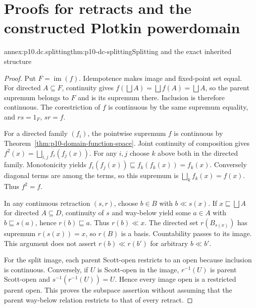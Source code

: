 \section{Proofs for retracts and the constructed Plotkin powerdomain}
\label{annex:p10-domain-constructions-retractions}

\begin{annexitem}{annex:p10.dc.splitting}{thm:p10-dc-splitting}{Splitting and the exact inherited structure}
\begin{proof}
Put \(F=\operatorname{im}(f)\). Idempotence makes image and fixed-point
set equal. For directed \(A\subseteq F\), continuity gives
\(f(\bigsqcup A)=\bigsqcup f(A)=\bigsqcup A\), so the parent supremum
belongs to \(F\) and is its supremum there. Inclusion is therefore
continuous. The corestriction of \(f\) is continuous by the same
supremum equality, and \(rs=1_F\), \(sr=f\).

For a directed family \((f_i)\), the pointwise supremum \(f\) is
continuous by Theorem~\ref{thm:p10-domain-function-space}. Joint
continuity of composition gives
\(f^2(x)=\bigsqcup_{i,j}f_i(f_j(x))\).
For any \(i,j\) choose \(k\) above both in the directed family.
Monotonicity yields \(f_i(f_j(x))\sqsubseteq f_k(f_k(x))=f_k(x)\).
Conversely diagonal terms are among the terms, so this supremum is
\(\bigsqcup_k f_k(x)=f(x)\). Thus \(f^2=f\).

In any continuous retraction \((s,r)\), choose \(b\in B\) with
\(b\ll s(x)\). If \(x\sqsubseteq\bigsqcup A\) for directed
\(A\subseteq D\), continuity of \(s\) and way-below yield some
\(a\in A\) with \(b\sqsubseteq s(a)\), hence \(r(b)\sqsubseteq a\).
Thus \(r(b)\ll x\). The directed set \(r(B_{s(x)})\) has supremum
\(r(s(x))=x\), so \(r(B)\) is a basis. Countability passes to its
image. This argument does not assert \(r(b)\ll r(b')\) for arbitrary
\(b\ll b'\).

For the split image, each parent Scott-open restricts to an open because
inclusion is continuous. Conversely, if \(U\) is Scott-open in the
image, \(r^{-1}(U)\) is parent Scott-open and
\(s^{-1}(r^{-1}(U))=U\). Hence every image open is a restricted parent
open. This proves the subspace assertion without assuming that the
parent way-below relation restricts to that of every retract.
\end{proof}
\end{annexitem}

